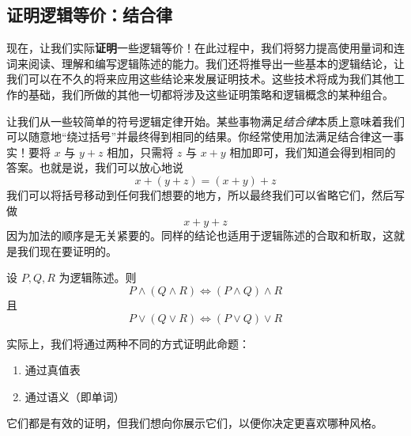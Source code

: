 \subsection{证明逻辑等价：结合律}

现在，让我们实际\textbf{证明}一些逻辑等价！在此过程中，我们将努力提高使用量词和连词来阅读、理解和编写逻辑陈述的能力。我们还将推导出一些基本的逻辑结论，让我们可以在不久的将来应用这些结论来发展证明技术。这些技术将成为我们其他工作的基础，我们所做的其他一切都将涉及这些证明策略和逻辑概念的某种组合。

让我们从一些较简单的符号逻辑定律开始。某些事物满足\emph{结合律}本质上意味着我们可以随意地``绕过括号''并最终得到相同的结果。你经常使用加法满足结合律这一事实！要将 $x$ 与 $y + z$ 相加，只需将 $z$ 与 $x+y$ 相加即可，我们知道会得到相同的答案。也就是说，我们可以放心地说
\[x + (y + z) = (x + y) + z\]
我们可以将括号移动到任何我们想要的地方，所以最终我们可以省略它们，然后写做
\[x+y+z\]
因为加法的顺序是无关紧要的。同样的结论也适用于逻辑陈述的合取和析取，这就是我们现在要证明的。

\begin{theorem}
    设 $P, Q, R$ 为逻辑陈述。则
    \[P \land (Q \land R) \iff (P \land Q) \land R\]
    且
    \[P \lor (Q \lor R) \iff (P \lor Q) \lor R\]
\end{theorem}

实际上，我们将通过两种不同的方式证明此命题：
\begin{enumerate}[label=(\arabic*)]
    \item 通过真值表
    \item 通过语义（即单词）
\end{enumerate}
它们都是有效的证明，但我们想向你展示它们，以便你决定更喜欢哪种风格。

